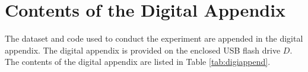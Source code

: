 %

\section{Contents of the Digital Appendix}
\label{sec:digiappend}
The dataset and code used to conduct the experiment are appended in the digital appendix. The digital appendix is provided on the enclosed USB flash drive $D$. The contents of the digital appendix are listed in Table \ref{tab:digiappend}.
